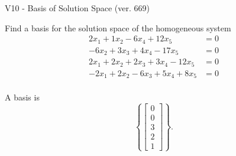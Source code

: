 \begin{exercise}
  \begin{exerciseTitle}V10 - Basis of Solution Space (ver. 669)\end{exerciseTitle}
  \begin{exerciseStatement}
    Find a basis for the solution space of the homogeneous system 
\begin{align*}
 2 x_ 1 + 1 x_ 2 -6 x_ 4 + 12 x_ 5 &= 0  \\ 
  -6 x_ 2 + 3 x_ 3 + 4 x_ 4 -17 x_ 5 &= 0  \\ 
  2 x_ 1 + 2 x_ 2 + 2 x_ 3 + 3 x_ 4 -12 x_ 5 &= 0  \\ 
  -2 x_ 1 + 2 x_ 2 -6 x_ 3 + 5 x_ 4 + 8 x_ 5 &= 0  \\ 
 \end{align*}


 
  \end{exerciseStatement}

  \begin{exerciseAnswer}
   A basis is   
\[\left\{\left[\begin{array}{c}
0 \\
0 \\
3 \\
2 \\
1
\end{array}\right]\right\}.\]

  


  \end{exerciseAnswer}
\end{exercise}